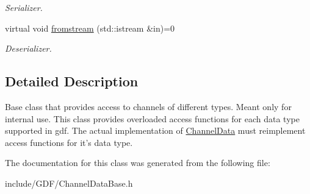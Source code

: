 \begin{DoxyCompactItemize}
\begin{DoxyCompactList}\small\item\em Serializer. \item\end{DoxyCompactList}\item 
\hypertarget{classgdf_1_1_channel_data_base_a47cd719f239610c4676296a5889e1878}{
virtual void \hyperlink{classgdf_1_1_channel_data_base_a47cd719f239610c4676296a5889e1878}{fromstream} (std::istream \&in)=0}
\label{classgdf_1_1_channel_data_base_a47cd719f239610c4676296a5889e1878}

\begin{DoxyCompactList}\small\item\em Deserializer. \item\end{DoxyCompactList}\end{DoxyCompactItemize}


\subsection{Detailed Description}
Base class that provides access to channels of different types. Meant only for internal use. This class provides overloaded access functions for each data type supported in gdf. The actual implementation of \hyperlink{classgdf_1_1_channel_data}{ChannelData} must reimplement access functions for it's data type. 

The documentation for this class was generated from the following file:\begin{DoxyCompactItemize}
\item 
include/GDF/ChannelDataBase.h\end{DoxyCompactItemize}
